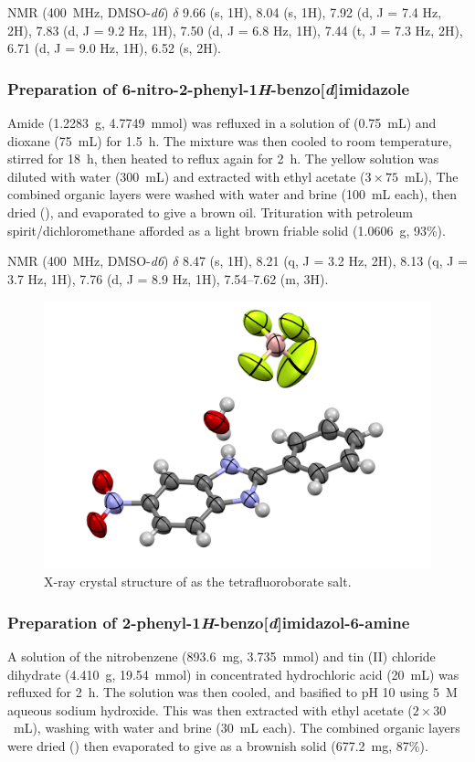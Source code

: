 \begin{refsection}
 NMR (400~MHz, DMSO-\emph{d6}) $\delta$ 9.66 (s, 1H), 8.04 (s, 1H), 7.92 (d, J = 7.4 Hz, 2H), 7.83 (d, J = 9.2 Hz, 1H), 7.50 (d, J = 6.8 Hz, 1H), 7.44 (t, J = 7.3 Hz, 2H), 6.71 (d, J = 9.0 Hz, 1H), 6.52 (s, 2H).

\subsubsection{Preparation of 6-nitro-2-phenyl-1\emph{H}-benzo[\emph{d}]imidazole }
Amide  (1.2283~g, 4.7749~mmol) was refluxed in a solution of  (0.75~mL) and dioxane (75~mL) for 1.5~h.
The mixture was then cooled to room temperature, stirred for 18~h, then heated to reflux again for 2~h.
The yellow solution was diluted with water (300~mL) and extracted with ethyl acetate ($3\times75$~mL),
The combined organic layers were washed with water and brine (100~mL each), then dried (), and evaporated to give a brown oil.
Trituration with petroleum spirit/dichloromethane afforded  as a light brown friable solid (1.0606~g, 93\%).

 NMR (400~MHz, DMSO-\emph{d6}) $\delta$ 8.47 (s, 1H), 8.21 (q, J = 3.2 Hz, 2H), 8.13 (q, J = 3.7 Hz, 1H), 7.76 (d, J = 8.9 Hz, 1H), 7.54--7.62 (m, 3H).

\begin{figure}[ht]
    \centering
    \includegraphics[width=0.8\linewidth]{Figures/rhs-nitro-xray.pdf}
    \caption{X-ray crystal structure of  as the tetrafluoroborate salt.}
    \label{fig:rhs-nitro-xray}
\end{figure}

\subsubsection{Preparation of 2-phenyl-1\emph{H}-benzo[\emph{d}]imidazol-6-amine }
A solution of the nitrobenzene  (893.6~mg, 3.735~mmol) and tin (II) chloride dihydrate (4.410~g, 19.54~mmol) in concentrated hydrochloric acid (20~mL) was refluxed for 2~h.
The solution was then cooled, and basified to pH 10 using 5~M aqueous sodium hydroxide.
This was then extracted with ethyl acetate ($2\times30$~mL), washing with water and brine (30~mL each).
The combined organic layers were dried () then evaporated to give  as a brownish solid (677.2~mg, 87\%).


\end{refsection}
